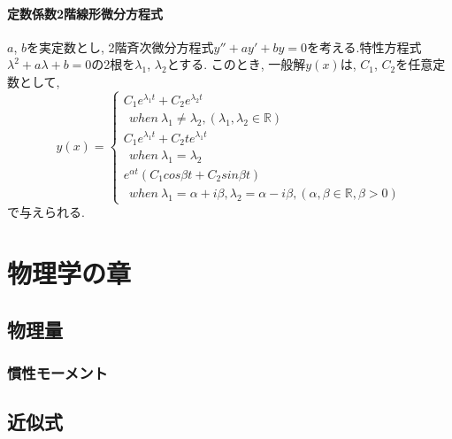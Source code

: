 \documentclass[]{jreport}
\begin{document}
\subsection{定数係数2階線形微分方程式}

$a$, $b$を実定数とし, 2階斉次微分方程式$y''+ay'+by=0$を考える.特性方程式$\lambda^2+a\lambda+b=0$の2根を$\lambda_{1}$, $\lambda_{2}$とする. このとき, 一般解$y(x)$は, $C_{1}$, $C_{2}$を任意定数として, \\
\begin{equation}
    y(x)= \left \{
        \begin{array}{l}
            C_{1}e^{\lambda_{1} t}+C_{2}e^{\lambda_{2} t}\\
            \ \ when \ \lambda_{1}\neq\lambda_{2}, (\lambda_{1}, \lambda_{2}\in\mathbb{R}) \\
            C_{1}e^{\lambda_{1} t}+C_{2}te^{\lambda_{1} t}\\
            \ \ when \ \lambda_{1}=\lambda_{2} \\
            e^{\alpha t}(C_{1}cos{\beta t}+C_{2}sin{\beta t}) \\
            \ \ when \ \lambda_{1}=\alpha+{i\beta}, \lambda_{2}=\alpha-{i\beta}, (\alpha, \beta\in\mathbb{R}, \beta>0)
        \end{array}
    \right.
\end{equation}
で与えられる.

\part{物理学の章}
\chapter{物理量}

\section{慣性モーメント}

\chapter{近似式}
\end{document}
